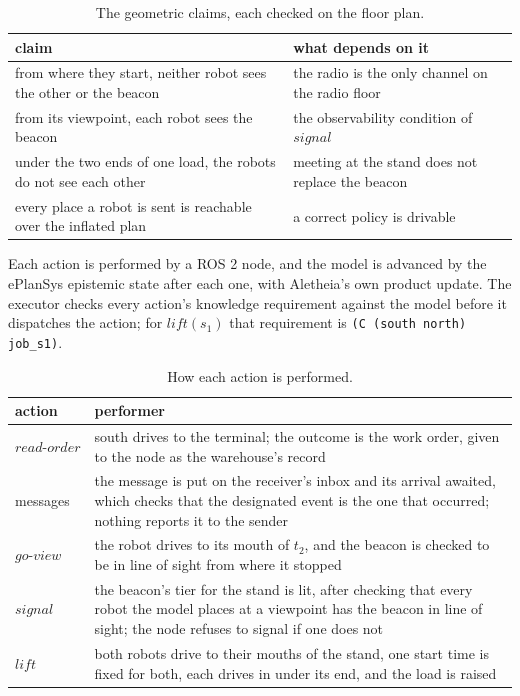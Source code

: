 \documentclass[11pt,a4paper]{article}
\theoremstyle{definition}
\newcommand{\code}[1]{\texttt{\small #1}}
\begin{document}
\begin{table}[H]
\centering\small
\caption{The geometric claims, each checked on the floor plan.}
\label{tab:geometry}
\begin{tabularx}{\textwidth}{@{}X X@{}}
\toprule
claim & what depends on it \\
\midrule
from where they start, neither robot sees the other or the beacon & the radio is the only channel on the radio floor \\
from its viewpoint, each robot sees the beacon & the observability condition of $\mathit{signal}$ \\
under the two ends of one load, the robots do not see each other & meeting at the stand does not replace the beacon \\
every place a robot is sent is reachable over the inflated plan & a correct policy is drivable \\
\bottomrule
\end{tabularx}
\end{table}

Each action is performed by a ROS 2 node, and the model is advanced by the
ePlanSys epistemic state after each one, with Aletheia's own product update.
The executor checks every action's knowledge requirement against the model
before it dispatches the action; for $\mathit{lift}(s_1)$ that requirement is
\code{(C (south north) job\_s1)}.

\begin{table}[H]
\centering\small
\caption{How each action is performed.}
\label{tab:performers}
\begin{tabularx}{\textwidth}{@{}l X@{}}
\toprule
action & performer \\
\midrule
$\mathit{read\text{-}order}$ & south drives to the terminal; the outcome is the work order, given to the node as the warehouse's record \\
messages & the message is put on the receiver's inbox and its arrival awaited, which checks that the designated event is the one that occurred; nothing reports it to the sender \\
$\mathit{go\text{-}view}$ & the robot drives to its mouth of $t_2$, and the beacon is checked to be in line of sight from where it stopped \\
$\mathit{signal}$ & the beacon's tier for the stand is lit, after checking that every robot the model places at a viewpoint has the beacon in line of sight; the node refuses to signal if one does not \\
$\mathit{lift}$ & both robots drive to their mouths of the stand, one start time is fixed for both, each drives in under its end, and the load is raised \\
\bottomrule
\end{tabularx}
\end{table}
\end{document}
